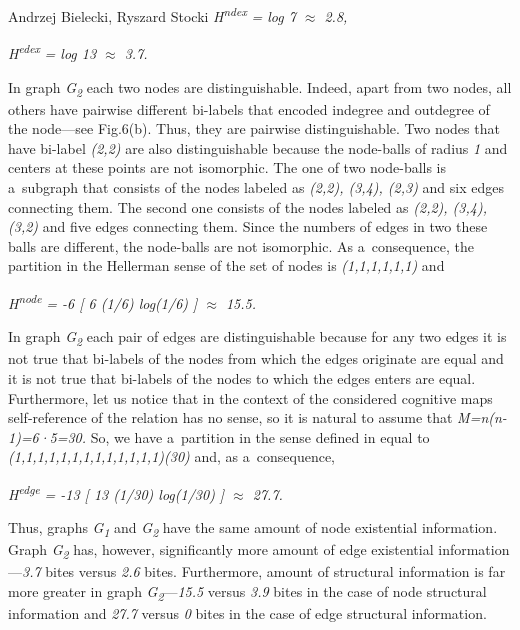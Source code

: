 \begin{artengenv2auth}{Andrzej Bielecki, Ryszard Stocki}
\textit{H}\textit{\textsuperscript{ndex}} \textit{= log 7 ${\approx}$ 2.8,}





\textit{H}\textit{\textsuperscript{edex}} \textit{= log 13 ${\approx}$ 3.7.}





In graph \textit{G}\textit{\textsubscript{2}} each two nodes are distinguishable. Indeed, apart from two nodes, all others have pairwise different bi-labels that encoded indegree and outdegree of the node---see Fig.6(b). Thus, they are pairwise distinguishable. Two nodes that have bi-label \textit{(2,2)} are also distinguishable because the node-balls of radius \textit{1} and centers at these points are not isomorphic. The one of two node-balls is a~subgraph that consists of the nodes labeled as \textit{(2,2), (3,4), (2,3)} and six edges connecting them. The second one consists of the nodes labeled as \textit{(2,2), (3,4), (3,2)} and five edges connecting them. Since the numbers of edges in two these balls are different, the node-balls are not isomorphic. As a~consequence, the partition in the Hellerman sense of the set of nodes is \textit{(1,1,1,1,1,1)} and



\textit{H}\textit{\textsuperscript{node}} \textit{= -6 [ 6 (1/6) log(1/6) ] ${\approx}$ 15.5.}





In graph \textit{G}\textit{\textsubscript{2}} each pair of edges are distinguishable because for any two edges it is not true that bi-labels of the nodes from which the edges originate are equal and it is not true that bi-labels of the nodes to which the edges enters are equal. Furthermore, let us notice that in the context of the considered cognitive maps self-reference of the relation has no sense, so it is natural to assume that \textit{M=n(n-1)=6·5=30.} So, we have a~partition in the sense defined in 
\parencite[][]{bielecki_information_2022} %
 equal to \textit{(1,1,1,1,1,1,1,1,1,1,1,1,1)(30)} and, as a~consequence,



\textit{H}\textit{\textsuperscript{edge}} \textit{= -13 [ 13 (1/30) log(1/30) ] ${\approx}$ 27.7.}





Thus, graphs \textit{G}\textit{\textsubscript{1}} and \textit{G}\textit{\textsubscript{2}} have the same amount of node existential information. Graph \textit{G}\textit{\textsubscript{2}} has, however, significantly more amount of edge existential information---\textit{3.7} bites versus \textit{2.6} bites. Furthermore, amount of structural information is far more greater in graph \textit{G}\textit{\textsubscript{2}}---\textit{15.5} versus \textit{3.9} bites in the case of node structural information and \textit{27.7} versus \textit{0} bites in the case of edge structural information.




\end{artengenv2auth}
